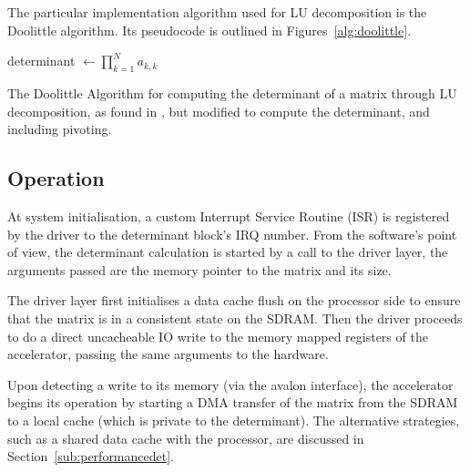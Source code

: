 \documentclass[]{article}
\begin{document}
The particular implementation algorithm used for LU decomposition is the Doolittle algorithm. Its pseudocode is outlined in Figures~\ref{alg:doolittle}.

\begin{algorithm}[tbp]
	\SetAlgoLined



	determinant $\leftarrow \prod_{k=1}^N a_{k,k}$
	\bigskip

	\caption{The Doolittle Algorithm for computing the determinant of a matrix through LU decomposition, as found in \cite{LUgen}, but modified to compute the determinant, and including pivoting.}
	\label{alg:doolittle}
\end{algorithm}


\subsection{Operation} %
\label{sub:operationdet}


At system initialisation, a custom Interrupt Service Routine (ISR) is registered by the driver to the determinant block’s IRQ number. From the software’s point of view, the determinant calculation is started by a call to the driver layer, the arguments passed are the memory pointer to the matrix and its size.

The driver layer first initialises a data cache flush on the processor side to ensure that the matrix is in a consistent state on the SDRAM. Then the driver proceeds to do a direct uncacheable IO write to the memory mapped registers of the accelerator, passing the same arguments to the hardware. 

Upon detecting a write to its memory (via the avalon interface), the accelerator begins its operation by starting a DMA transfer of the matrix from the SDRAM to a local cache (which is private to the determinant). The alternative strategies, such as a shared data cache with the processor, are discussed in Section~\ref{sub:performancedet}.
\end{document}

